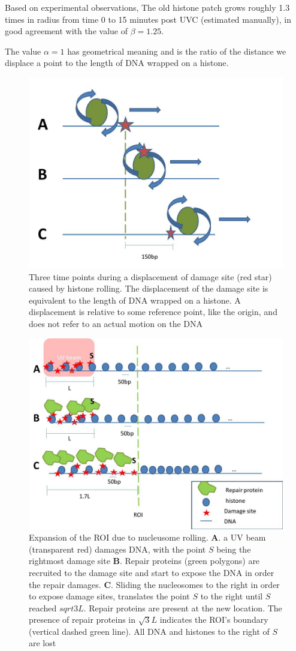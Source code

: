 \documentclass[12pt]{paper}
\begin{document}
     Based on experimental observations,
     The old histone patch grows roughly 1.3 times in radius from time 0 to 15 minutes post UVC (estimated manually), in good agreement with the value of $\beta =1.25$.
     
     The value $\alpha=1$ has geometrical meaning and is the ratio of the distance we displace a point to the length of DNA wrapped on a histone. 
                        
        
      
	\begin{figure}
	\centering
	\includegraphics[width=0.7\linewidth]{histoneSlidingSingle}
	\caption{{Three time points during a displacement of damage site (red star) caused by histone rolling. The displacement of the damage site is equivalent to the length of DNA wrapped on a histone. A displacement is relative to some reference point, like the origin, and does not refer to an actual motion on the DNA}}
	\label{fig:histoneSlidingSingle}
	\end{figure}
		
	\begin{figure}
	\centering
	\includegraphics[width=0.7\linewidth]{histoneSlidingMulti}
	\caption{Expansion of the ROI due to nucleusome rolling. \textbf{A}. a UV beam (transparent red) damages DNA, with the point $S$ being the rightmost damage site \textbf{B}. Repair proteins (green polygons) are recruited to the damage site and start to expose the DNA in order the repair damages. \textbf{C}. Sliding the nucleosomes to the right in order to expose damage sites, translates the point $S$ to the right until $S$ reached $sqrt{3}L$. Repair proteins are present at the new location. The presence of repair proteins in $\sqrt{3}L$ indicates the ROI's boundary (vertical dashed green line). All DNA and histones to the right of $S$ are lost}
	\label{fig:histoneSlidingMulti}
	\end{figure}
\end{document}
